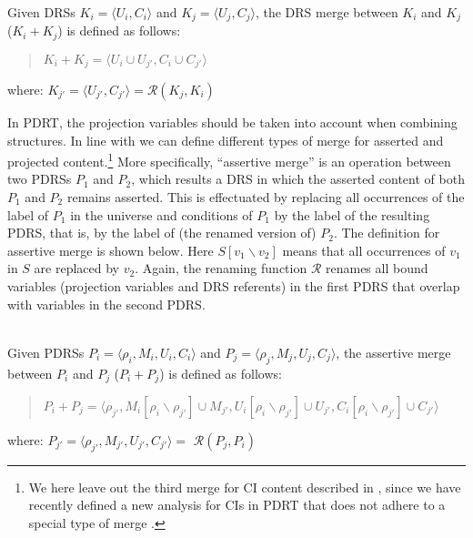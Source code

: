 \begin{definition}\label{def:DRSmerge}~\\
Given DRSs $K_i=\langle U_i,C_i \rangle$ and $K_j=\langle U_j,C_j \rangle$,
the DRS merge between $K_i$ and $K_j$ ($K_i + K_j$) is defined as follows:
  \begin{quote}
    $K_i + K_j = 
    \langle U_i\cup U_{j'},C_i \cup C_{j'}\rangle$
  \end{quote}
  where: $K_{j'} = \langle U_{j'},C_{j'} \rangle = \mathcal{R}(K_j,K_i)$
\end{definition}

In PDRT, the projection variables should be taken into account when
combining structures.  In line with  we can
define different types of merge for asserted and projected
content.\footnote{We here leave out the third merge for CI content described
in , since we have recently defined a new
analysis for CIs in PDRT that does not adhere to a special type of merge
\cite{venhuizenInPrepSALT}.} More specifically, ``assertive merge'' is an
operation between two PDRSs $P_1$ and $P_2$, which results a DRS in which
the asserted content of both $P_1$ and $P_2$ remains asserted. This is
effectuated by replacing all occurrences of the label of $P_1$ in the
universe and conditions of $P_1$ by the label of the resulting PDRS, that
is, by the label of (the renamed version of) $P_2$. The definition for
assertive merge is shown below. Here $S[v_1\backslash v_2]$ means that all
occurrences of $v_1$ in $S$ are replaced by $v_2$. Again, the renaming
function $\mathcal{R}$ renames all bound variables (projection variables and
DRS referents) in the first PDRS that overlap with variables in the second
PDRS.

\begin{definition}\label{def:amerge}~\\
Given PDRSs $P_i=\langle \rho_i,M_i,U_i,C_i \rangle$ and
$P_j=\langle \rho_j,M_j,U_j,C_j \rangle$, the assertive merge between $P_i$
and $P_j$ ($P_i + P_j$) is defined as follows:
  \begin{quote}
    $P_i + P_j = 
      \langle \rho_{j'}, 
      M_{i}[\rho_i\backslash\rho_{j'}] \cup M_{j'},
      U_{i}[\rho_i\backslash\rho_{j'}] \cup U_{j'},
      C_{i}[\rho_i\backslash\rho_{j'}] \cup C_{j'}\rangle$
  \end{quote}
  where: $P_{j'} = \langle \rho_{j'}, M_{j'}, U_{j'}, C_{j'} \rangle =$
      $\mathcal{R}(P_j,P_i)$
\end{definition}

